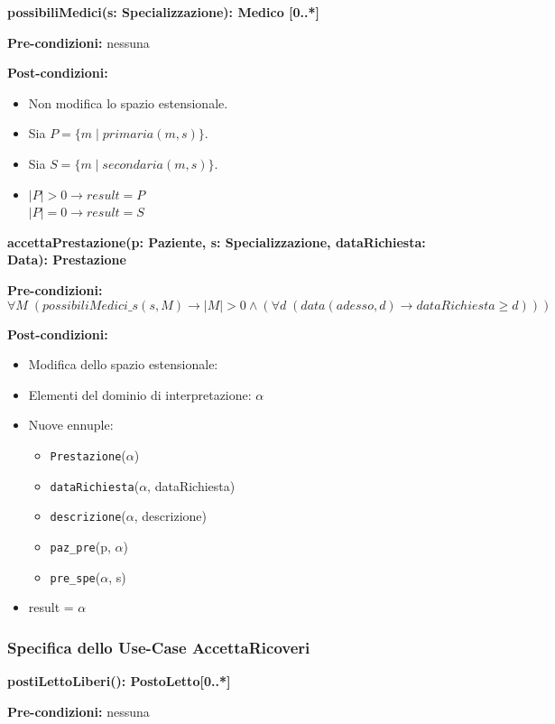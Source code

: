 \documentclass{article}
\begin{document}
\textbf{possibiliMedici(s: Specializzazione): Medico [0..*]}

\textbf{Pre-condizioni:} nessuna

\textbf{Post-condizioni:}
\begin{itemize}
    \item Non modifica lo spazio estensionale.
    \item Sia \( P = \{m \mid primaria(m,s)\} \).
    \item Sia \( S = \{m \mid secondaria(m,s)\} \).
    \item \(|P| > 0 \rightarrow result = P \) \\
    \(|P| = 0 \rightarrow result = S \)
\end{itemize}

\textbf{accettaPrestazione(p: Paziente, s: Specializzazione, dataRichiesta: Data): Prestazione}

\textbf{Pre-condizioni:}
\[
\forall M \; (possibiliMedici\_s(s,M) \rightarrow |M| > 0 \land (\forall d \; (data(adesso,d) \rightarrow dataRichiesta \geq d)))
\]

\textbf{Post-condizioni:}
\begin{itemize}
    \item Modifica dello spazio estensionale:
    \item Elementi del dominio di interpretazione: \( \alpha \)
    \item Nuove ennuple:
    \begin{itemize}
        \item \texttt{Prestazione}(\(\alpha\))
        \item \texttt{dataRichiesta}(\(\alpha\), dataRichiesta)
        \item \texttt{descrizione}(\(\alpha\), descrizione)
        \item \texttt{paz\_pre}(p, \(\alpha\))
        \item \texttt{pre\_spe}(\(\alpha\), s)
    \end{itemize}
    \item result = \( \alpha \)
\end{itemize}

\newpage
\subsubsection{Specifica dello Use-Case AccettaRicoveri}

\textbf{postiLettoLiberi(): PostoLetto[0..*]}

\textbf{Pre-condizioni:} nessuna
\end{document}
